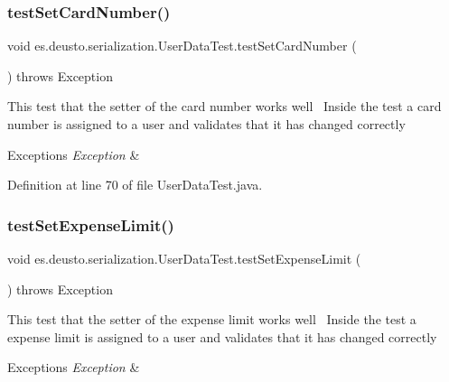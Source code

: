 \subsubsection{\texorpdfstring{test\+Set\+Card\+Number()}{testSetCardNumber()}}
{\footnotesize\ttfamily void es.\+deusto.\+serialization.\+User\+Data\+Test.\+test\+Set\+Card\+Number (\begin{DoxyParamCaption}{ }\end{DoxyParamCaption}) throws Exception}

This test that the setter of the card number works well~\newline
Inside the test a card number is assigned to a user and validates that it has changed correctly~\newline

\begin{DoxyExceptions}{Exceptions}
{\em Exception} & \\
\hline
\end{DoxyExceptions}


Definition at line 70 of file User\+Data\+Test.\+java.

\mbox{\label{classes_1_1deusto_1_1serialization_1_1_user_data_test_ac7e111d2323a6970210cfa086b2eedff}} 
\subsubsection{\texorpdfstring{test\+Set\+Expense\+Limit()}{testSetExpenseLimit()}}
{\footnotesize\ttfamily void es.\+deusto.\+serialization.\+User\+Data\+Test.\+test\+Set\+Expense\+Limit (\begin{DoxyParamCaption}{ }\end{DoxyParamCaption}) throws Exception}

This test that the setter of the expense limit works well~\newline
Inside the test a expense limit is assigned to a user and validates that it has changed correctly~\newline

\begin{DoxyExceptions}{Exceptions}
{\em Exception} & \\
\hline
\end{DoxyExceptions}


